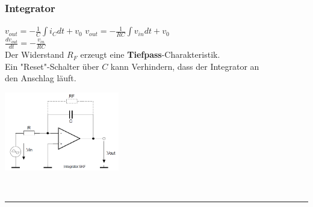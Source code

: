 		\begin{minipage}[c]{12cm}
		\subsubsection{Integrator} 
			$v_{out}=-\frac{1}{C} \int{i_C}dt + v_0$
			$v_{out}=-\frac{1}{RC} \int{v_{in}}dt +
			v_0 $\\
			$\frac{dv_{out}}{dt}=-\frac{v_{in}}{RC}$\\
			Der Widerstand $R_F$ erzeugt eine {\bf Tiefpass}-Charakteristik. \\
			Ein "Reset"-Schalter über $C$ kann Verhindern, dass der Integrator an\\
			den Anschlag läuft.
		\end{minipage} 
		\begin{minipage}[c]{5cm}
          	\includegraphics[width=5cm]{./images/integrator.png} 
        \end{minipage}\\
\hrule     
   
